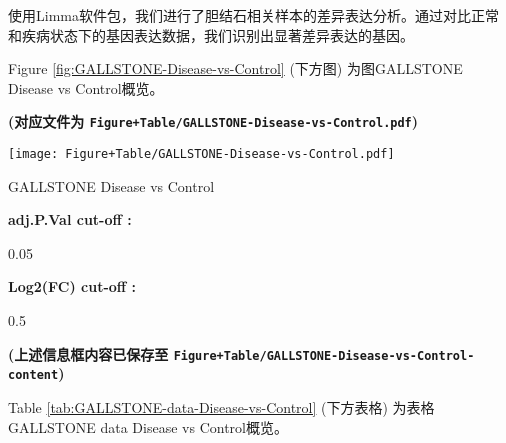 \documentclass[
]{article}
\begin{document}
使用Limma软件包，我们进行了胆结石相关样本的差异表达分析。通过对比正常和疾病状态下的基因表达数据，我们识别出显著差异表达的基因。

\begin{center}\vspace{1.5cm}\end{center}

Figure \ref{fig:GALLSTONE-Disease-vs-Control} (下方图) 为图GALLSTONE Disease vs Control概览。

\textbf{(对应文件为 \texttt{Figure+Table/GALLSTONE-Disease-vs-Control.pdf})}

\def\@captype{figure}
\begin{center}
\texttt{[image: Figure+Table/GALLSTONE-Disease-vs-Control.pdf]}
\caption{GALLSTONE Disease vs Control}\label{fig:GALLSTONE-Disease-vs-Control}
\end{center}

\begin{center}\vspace{1.5cm}\end{center}\begin{center}\begin{tcolorbox}[colback=gray!10, colframe=gray!50, width=0.9\linewidth, arc=1mm, boxrule=0.5pt]
\textbf{
adj.P.Val cut-off
:}

\vspace{0.5em}

    0.05

\vspace{2em}


\textbf{
Log2(FC) cut-off
:}

\vspace{0.5em}

    0.5

\vspace{2em}
\end{tcolorbox}
\end{center}

\textbf{(上述信息框内容已保存至 \texttt{Figure+Table/GALLSTONE-Disease-vs-Control-content})}

\begin{center}\vspace{1.5cm}\end{center}

Table \ref{tab:GALLSTONE-data-Disease-vs-Control} (下方表格) 为表格GALLSTONE data Disease vs Control概览。
\end{document}
